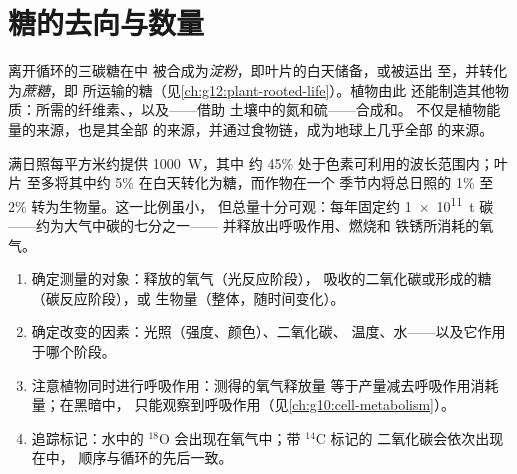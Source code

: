 \section{糖的去向与数量}

\begin{proposition}[产物的去向]\label{prop:g12:photosynthesis:fates}
离开循环的三碳糖在中
被合成为\emph{淀粉}，即叶片的白天储备，或被运出
至，并转化为\emph{蔗糖}，即
所运输的糖（见\cref{ch:g12:plant-rooted-life}）。植物由此
还能制造其他物质：所需的纤维素、，以及——借助
土壤中的氮和硫——合成和。
不仅是植物能量的来源，也是其全部
的来源，并通过食物链，成为地球上几乎全部
的来源。
\end{proposition}
\admitted

\begin{example}[效率：从叶到星球]\label{ex:g12:photosynthesis:efficiency}
满日照每平方米约提供 \qty{1000}{W}，其中
约 45\% 处于色素可利用的波长范围内；叶片
至多将其中约 5\% 在白天转化为糖，而作物在一个
季节内将总日照的 1\% 至 2\% 转为生物量。这一比例虽小，
但总量十分可观：每年固定约
\qty{1e11}{t} 碳——约为大气中碳的七分之一——
并释放出呼吸作用、燃烧和
铁锈所消耗的氧气。
\end{example}

\begin{method}[分析光合作用实验]\label{met:g12:photosynthesis:experiment}
\begin{enumerate}
  \item 确定测量的对象：释放的氧气（光反应阶段），
        吸收的二氧化碳或形成的糖（碳反应阶段），或
        生物量（整体，随时间变化）。
  \item 确定改变的因素：光照（强度、颜色）、二氧化碳、
        温度、水——以及它作用于哪个阶段。
  \item 注意植物同时进行呼吸作用：测得的氧气释放量
        等于产量减去呼吸作用消耗量；在黑暗中，
        只能观察到呼吸作用（见\cref{ch:g10:cell-metabolism}）。
  \item 追踪标记：水中的 $^{18}$O 会出现在氧气中；带 $^{14}$C 标记的
        二氧化碳会依次出现在中，
        顺序与循环的先后一致。
\end{enumerate}
\end{method}

